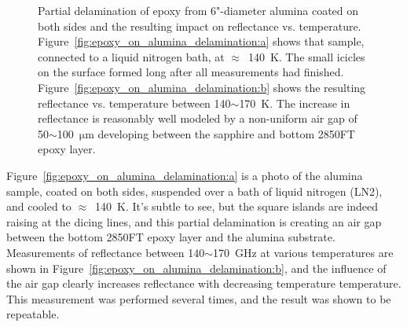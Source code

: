 \begin{figure}[!t]
    \centering
    \caption[Partial delamination of epoxy from alumina and the resulting impact on reflectance vs. temperature.]{Partial delamination of epoxy from 6"-diameter alumina coated on both sides and the resulting impact on reflectance vs. temperature. Figure~\ref{fig:epoxy_on_alumina_delamination:a} shows that sample, connected to a liquid nitrogen bath, at $\approx$~140~K. The small icicles on the surface formed long after all measurements had finished. Figure~\ref{fig:epoxy_on_alumina_delamination:b} shows the resulting reflectance vs. temperature between 140$\sim$170~K. The increase in reflectance is reasonably well modeled by a non-uniform air gap of 50$\sim$100~$\mathrm{\mu m}$ developing between the sapphire and bottom 2850FT epoxy layer.}
    \label{fig:epoxy_on_alumina_delamination}
\end{figure}

Figure~\ref{fig:epoxy_on_alumina_delamination:a} is a photo of the alumina sample, coated on both sides, suspended over a bath of liquid nitrogen (LN2), and cooled to $\approx$~140~K. It's subtle to see, but the square islands are indeed raising at the dicing lines, and this partial delamination is creating an air gap between the bottom 2850FT epoxy layer and the alumina substrate. Measurements of reflectance between 140$\sim$170~GHz at various temperatures are shown in Figure~\ref{fig:epoxy_on_alumina_delamination:b}, and the influence of the air gap clearly increases reflectance with decreasing temperature temperature. This measurement was performed several times, and the result was shown to be repeatable.

